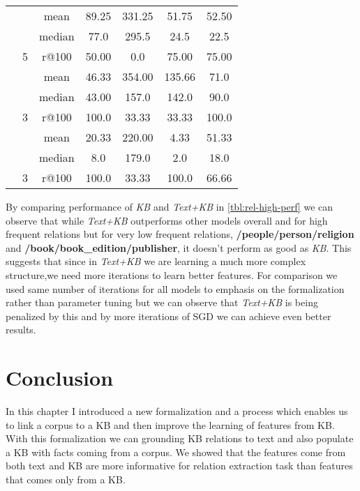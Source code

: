 \begin{table}[ht]
\begin{tabular}{l  c c c c  c c}
    &   & mean & 89.25 & 331.25  & 51.75 & 52.50  \\[-1ex]
   &  & median & 77.0 & 295.5 & 24.5 & 22.5 \\[-1ex]
\raisebox{0.0ex}{ /music/composer/compositions} &  5
 &r@100& 50.00 & 0.0 & 75.00 & 75.00 \\[1ex]
 
    &   & mean & 46.33 & 354.00 & 135.66 &71.0  \\[-1ex]
   &  & median & 43.00 &  157.0 & 142.0 & 90.0 \\[-1ex]
\raisebox{0.0ex}{  /book/book\_edition/publisher} &  3
 &r@100& 100.0 & 33.33  & 33.33 & 100.0 \\[1ex]
 
      &   & mean & 20.33 & 220.00 & 4.33 & 51.33 \\[-1ex]
   &  & median & 8.0 & 179.0 & 2.0 & 18.0 \\[-1ex]
\raisebox{0.0ex}{ /people/person/religion} &  3
 &r@100& 100.0 &33.33  & 100.0 & 66.66 \\[1ex]
 

\hline %
\end{tabular}

\end{table}

By comparing performance of \textit{KB} and \textit{Text+KB} in
\autoref{tbl:rel-high-perf} we can observe that while \textit{Text+KB}
outperforms other models overall and for high frequent relations but for very
low frequent relations, \textbf{/people/person/religion} and
\textbf{/book/book\_edition/publisher}, it doesn't perform as good
as \textit{KB}.
This suggests that since in \textit{Text+KB} we are learning a much more complex
structure,we need more iterations to learn better features. For comparison we
used same number of iterations for all models to emphasis on the formalization
rather than parameter tuning but we can observe that \textit{Text+KB} is being
penalized by this and by more iterations of SGD we can achieve even better
results.

\section{Conclusion}
\label{sec:textkb-conc}

In this chapter I introduced a new formalization and a process which
enables us to link a corpus to a KB and then improve the learning of features
from KB. With this formalization we can grounding KB relations to
 text and also populate a KB with facts coming from a corpus. We showed that the features come
from both text and KB are more informative for relation extraction task than
features that comes only from a KB.
